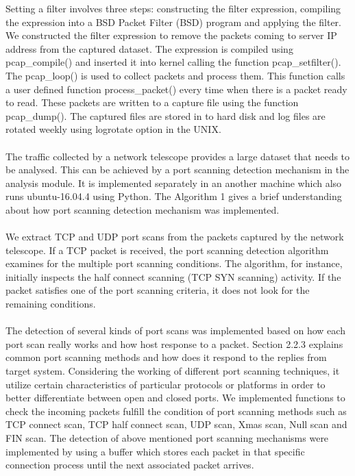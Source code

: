 Setting a filter involves three steps: constructing the filter expression, compiling the expression into a BSD Packet Filter (BSD) program and applying the filter.
We constructed the filter expression to remove the packets coming to server IP address from the captured dataset.
The expression is compiled using pcap\_compile() and inserted it into kernel calling the function pcap\_setfilter().
The pcap\_loop() is used to collect packets and process them.
This function calls a user defined function process\_packet() every time when there is a packet ready to read.
These packets are written to a capture file using the function pcap\_dump(). 
The captured files are stored in to hard disk and log files are rotated weekly using logrotate option in the UNIX.\\\\
The traffic collected by a network telescope provides a large dataset that needs to be analysed.
This can be achieved by a port scanning detection mechanism in the analysis module.
It is implemented separately in an another machine  which also runs ubuntu-16.04.4 using Python.
The Algorithm 1 gives a brief understanding about how port scanning detection mechanism was implemented.\\\\
We extract TCP and UDP port scans from the packets captured by the network telescope.
If a TCP packet is received, the port scanning detection algorithm examines for the multiple port scanning conditions.
The algorithm, for instance, initially inspects the half connect scanning (TCP SYN scanning) activity.
If the packet satisfies one of the port scanning criteria, it does not look for the remaining conditions.\\\\
The detection of several kinds of port scans  was implemented based on how each port scan really works and how host response to a packet. 
Section 2.2.3 explains common port scanning methods and how does it respond to the replies from target system.
Considering the working of different port scanning techniques, it utilize certain characteristics of particular protocols or platforms in order to better differentiate between open and closed ports.
We implemented functions to check the incoming packets fulfill the  condition of port scanning methods such as TCP connect scan, TCP half connect scan, UDP scan, Xmas scan, Null scan and FIN scan.
The detection of above mentioned port scanning mechanisms were implemented by using a buffer which stores each packet in that specific connection process until the next associated packet arrives. 
